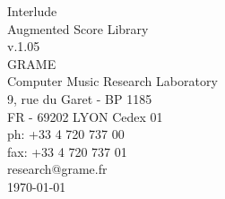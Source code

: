 \documentclass[a4paper]{book}
\begin{document}
\begin{titlepage}
\vspace*{7cm}
\begin{center}
{\huge Interlude\\ Augmented Score Library \\[1ex]\large v.1.05}\\
\vspace*{2cm}
{\large GRAME \\ Computer Music Research Laboratory}\\
\vspace*{0.5cm}
{\small 9, rue du Garet - BP 1185}\\
{\small FR - 69202 LYON Cedex 01}\\
\vspace*{0.5cm}
{\small ph:  +33 4 720 737 00}\\
{\small fax: +33 4 720 737 01}\\
\vspace*{0.5cm}
{\small research@grame.fr}\\
\vspace*{0.5cm}
\today 
\end{center}
\end{titlepage}
\clearemptydoublepage
{}
\tableofcontents
\clearemptydoublepage
{}
\end{document}
